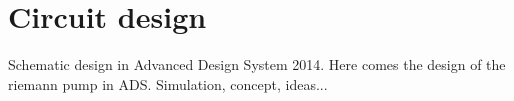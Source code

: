 \chapter{Circuit design}
Schematic design in Advanced Design System 2014. 
Here comes the design of the riemann pump in ADS. Simulation, concept, ideas... 
